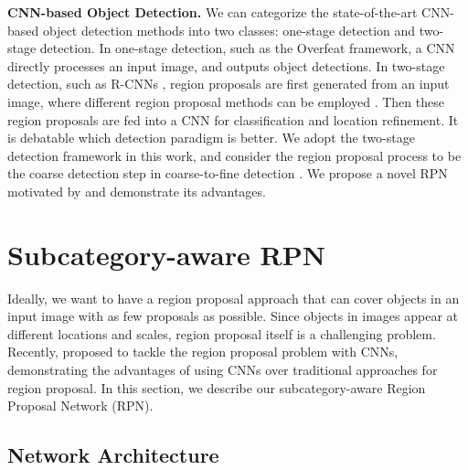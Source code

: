 \documentclass[10pt,twocolumn,letterpaper]{article}
\begin{document}
\noindent \textbf{CNN-based Object Detection.} We can categorize the state-of-the-art CNN-based object detection methods into two classes: one-stage detection and two-stage detection. In one-stage detection, such as the Overfeat \cite{sermanet2013overfeat} framework, a CNN directly processes an input image, and outputs object detections. In two-stage detection, such as R-CNNs \cite{girshick2013rich,girshick2015fast,ren2015faster}, region proposals are first generated from an input image, where different region proposal methods can be employed \cite{uijlings2013selective,zitnick2014edge,arbelaez2014multiscale}. Then these region proposals are fed into a CNN for classification and location refinement. It is debatable which detection paradigm is better. We adopt the two-stage detection framework in this work, and consider the region proposal process to be the coarse detection step in coarse-to-fine detection \cite{viola2004robust}. We propose a novel RPN motivated by \cite{ren2015faster} and demonstrate its advantages.

\section{Subcategory-aware RPN}

Ideally, we want to have a region proposal approach that can cover objects in an input image with as few proposals as possible. Since objects in images appear at different locations and scales, region proposal itself is a challenging problem. Recently, \cite{ren2015faster} proposed to tackle the region proposal problem with CNNs, demonstrating the advantages of using CNNs over traditional approaches for region proposal. In this section, we describe our subcategory-aware Region Proposal Network (RPN).

\subsection{Network Architecture}
\end{document}
